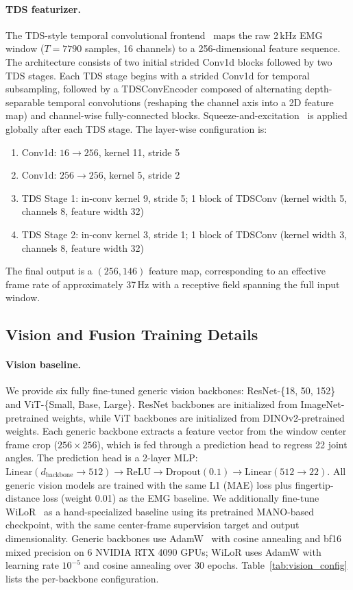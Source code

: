 \documentclass{article}
\begin{document}
\paragraph{TDS featurizer.}
The TDS-style temporal convolutional frontend~\citep{tds} maps the raw 2\,kHz EMG window ($T=7790$ samples, 16 channels) to a 256-dimensional feature sequence. The architecture consists of two initial strided Conv1d blocks followed by two TDS stages. Each TDS stage begins with a strided Conv1d for temporal subsampling, followed by a TDSConvEncoder composed of alternating depth-separable temporal convolutions (reshaping the channel axis into a 2D feature map) and channel-wise fully-connected blocks. Squeeze-and-excitation~\citep{senet} is applied globally after each TDS stage. The layer-wise configuration is:
\begin{enumerate}[leftmargin=1.5em,nosep]
    \item Conv1d: $16 \to 256$, kernel 11, stride 5
    \item Conv1d: $256 \to 256$, kernel 5, stride 2
    \item TDS Stage 1: in-conv kernel 9, stride 5; 1 block of TDSConv (kernel width 5, channels 8, feature width 32)
    \item TDS Stage 2: in-conv kernel 3, stride 1; 1 block of TDSConv (kernel width 3, channels 8, feature width 32)
\end{enumerate}
The final output is a $(256, 146)$ feature map, corresponding to an effective frame rate of approximately 37\,Hz with a receptive field spanning the full input window.

\subsection{Vision and Fusion Training Details}
\label{app:training_details_vision}

\paragraph{Vision baseline.}
We provide six fully fine-tuned generic vision backbones: ResNet-\{18, 50, 152\} and ViT-\{Small, Base, Large\}. ResNet backbones are initialized from ImageNet-pretrained weights, while ViT backbones are initialized from DINOv2-pretrained weights. Each generic backbone extracts a feature vector from the window center frame crop ($256\times256$), which is fed through a prediction head to regress 22 joint angles. The prediction head is a 2-layer MLP: $\text{Linear}(d_{\text{backbone}} \to 512) \to \text{ReLU} \to \text{Dropout}(0.1) \to \text{Linear}(512 \to 22)$. All generic vision models are trained with the same L1 (MAE) loss plus fingertip-distance loss (weight 0.01) as the EMG baseline. We additionally fine-tune WiLoR~\citep{wilor} as a hand-specialized baseline using its pretrained MANO-based checkpoint, with the same center-frame supervision target and output dimensionality. Generic backbones use AdamW~\citep{adamw} with cosine annealing and bf16 mixed precision on 6 NVIDIA RTX 4090 GPUs; WiLoR uses AdamW with learning rate $10^{-5}$ and cosine annealing over 30 epochs. Table~\ref{tab:vision_config} lists the per-backbone configuration.
\end{document}
